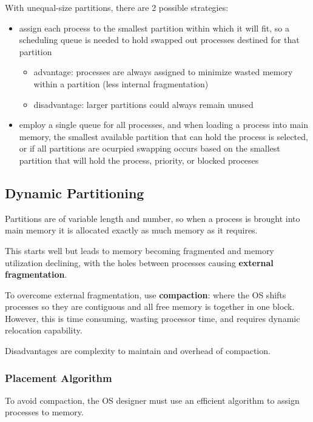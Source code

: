 \documentclass[11pt]{article}
\begin{document}
With unequal-size partitions, there are 2 possible strategies:
\begin{itemize}
\item assign each process to the smallest partition within which it will fit, so
a scheduling queue is needed to hold swapped out processes destined for that
partition
\begin{itemize}
\item advantage: processes are always assigned to minimize wasted memory within a
partition (less internal fragmentation)
\item disadvantage: larger partitions could always remain unused
\end{itemize}
\item employ a single queue for all processes, and when loading a process into main
memory, the smallest available partition that can hold the process is
selected, or if all partitions are ocurpied swapping occurs based on the
smallest partition that will hold the process, priority, or blocked proceses
\end{itemize}
\subsection{Dynamic Partitioning}
\label{sec:org334c43d}
Partitions are of variable length and number, so when a process is brought into
main memory it is allocated exactly as much memory as it requires.

This starts well but leads to memory becoming fragmented and memory utilization
declining, with the holes between processes causing \textbf{external fragmentation}.

To overcome external fragmentation, use \textbf{compaction}: where the OS shifts
processes so they are contiguous and all free memory is together in one block.
However, this is time consuming, wasting processor time, and requires dynamic
relocation capability.

Disadvantages are complexity to maintain and overhead of compaction.
\subsubsection{Placement Algorithm}
\label{sec:org9af2908}
To avoid compaction, the OS designer must use an efficient algorithm to assign
processes to memory.
\end{document}
